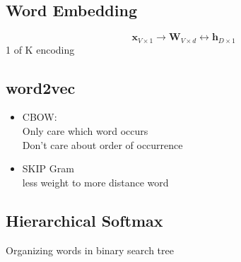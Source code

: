 \subsection{Word Embedding}
\begin{equation}
	\textbf{x}_{V \times 1} \longrightarrow \textbf{W}_{V \times d} \longleftrightarrow \textbf{h}_{D \times 1}
\end{equation}
1 of K encoding

\subsection{word2vec}
\begin{itemize}
	\item CBOW: \\
	Only care which word occurs\\
	Don't care about order of occurrence
	\item SKIP Gram \\
	less weight to more distance word
\end{itemize}

\subsection{Hierarchical Softmax}
Organizing words in binary search tree